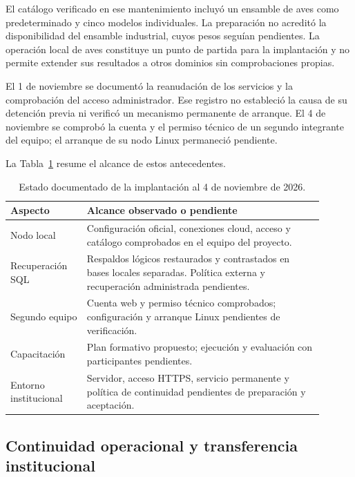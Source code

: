 El catálogo verificado en ese mantenimiento incluyó un ensamble de aves como
predeterminado y cinco modelos individuales. La preparación no acreditó la
disponibilidad del ensamble industrial, cuyos pesos seguían pendientes. La
operación local de aves constituye un punto de partida para la implantación y
no permite extender sus resultados a otros dominios sin comprobaciones propias.

El 1 de noviembre se documentó la reanudación de los servicios y la
comprobación del acceso administrador. Ese registro no estableció la causa de
su detención previa ni verificó un mecanismo permanente de arranque. El 4 de
noviembre se comprobó la cuenta y el permiso técnico de un segundo integrante
del equipo; el arranque de su nodo Linux permaneció pendiente.

La Tabla~\ref{tab:estado-implantacion} resume el alcance de estos antecedentes.

\begin{table}[htbp]
    \centering
    \caption{Estado documentado de la implantación al 4 de noviembre de 2026.}
    \label{tab:estado-implantacion}
    \begingroup
    \small
    \renewcommand{\arraystretch}{1.18}
    \begin{tabular}{p{0.22\linewidth} p{0.68\linewidth}}
        \hline
        \textbf{Aspecto} & \textbf{Alcance observado o pendiente} \\
        \hline
        Nodo local & Configuración oficial, conexiones cloud, acceso y catálogo comprobados en el equipo del proyecto. \\
        Recuperación SQL & Respaldos lógicos restaurados y contrastados en bases locales separadas. Política externa y recuperación administrada pendientes. \\
        Segundo equipo & Cuenta web y permiso técnico comprobados; configuración y arranque Linux pendientes de verificación. \\
        Capacitación & Plan formativo propuesto; ejecución y evaluación con participantes pendientes. \\
        Entorno institucional & Servidor, acceso HTTPS, servicio permanente y política de continuidad pendientes de preparación y aceptación. \\
        \hline
    \end{tabular}
    \endgroup
\end{table}

\subsection{Continuidad operacional y transferencia institucional}

